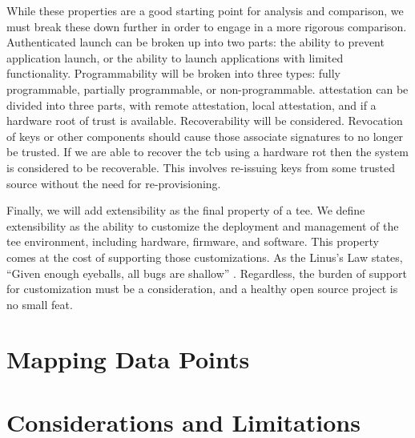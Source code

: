 While these properties are a good starting point for analysis and comparison, we must break these down further in order to engage in a more rigorous comparison. Authenticated launch can be broken up into two parts: the ability to prevent application launch, or the ability to launch applications with limited functionality. Programmability will be broken into three types: fully programmable, partially programmable, or non-programmable. \Gls{attestation} can be divided into three parts, with remote attestation, local attestation, and if a hardware root of trust is available. Recoverability will be considered. Revocation of keys or other components should cause those associate signatures to no longer be trusted. If we are able to recover the \gls{tcb} using a hardware \gls{rot} then the system is considered to be recoverable. This involves re-issuing keys from some trusted source without the need for re-provisioning.

Finally, we will add extensibility as the final property of a \gls{tee}. We define extensibility as the ability to customize the deployment and management of the \gls{tee} environment, including hardware, firmware, and software. This property comes at the cost of supporting those customizations. As the Linus's Law states, ``Given enough eyeballs, all bugs are shallow'' \cite{raymond1999cathedral}. Regardless, the burden of support for customization must be a consideration, and a healthy open source project is no small feat.

\section{Mapping Data Points}

\renewcommand{\arraystretch}{1}


\section{Considerations and Limitations}
